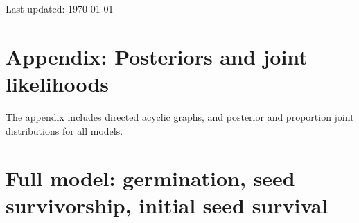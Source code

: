 \documentclass[12pt, oneside, titlepage]{article}   	%
\begin{document}
Last updated: \today

\section{Appendix: Posteriors and joint likelihoods}

The appendix includes directed acyclic graphs, and posterior and proportion joint distributions for all models.

\clearpage
\newpage

\section{Full model: germination, seed survivorship, initial seed survival}
\end{document}
